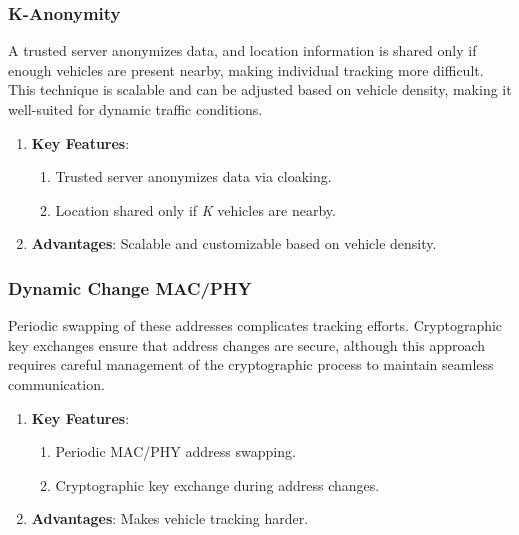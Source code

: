 \subsubsection{K-Anonymity}
A trusted server anonymizes data, and location information is shared only if enough vehicles are present nearby, making individual tracking more difficult.
This technique is scalable and can be adjusted based on vehicle density, making it well-suited for dynamic traffic conditions.
\begin{enumerate}
    \item \textbf{Key Features}:
    \begin{enumerate}
        \item Trusted server anonymizes data via cloaking.
        \item Location shared only if \emph{K} vehicles are nearby.
    \end{enumerate}
    \item \textbf{Advantages}: Scalable and customizable based on vehicle density.
\end{enumerate}

\subsubsection{Dynamic Change MAC/PHY}
Periodic swapping of these addresses complicates tracking efforts.
Cryptographic key exchanges ensure that address changes are secure, although this approach requires careful management of the cryptographic process to maintain seamless communication.
\begin{enumerate}
    \item \textbf{Key Features}:
    \begin{enumerate}
        \item Periodic MAC/PHY address swapping.
        \item Cryptographic key exchange during address changes.
    \end{enumerate}
    \item \textbf{Advantages}: Makes vehicle tracking harder.
\end{enumerate}

